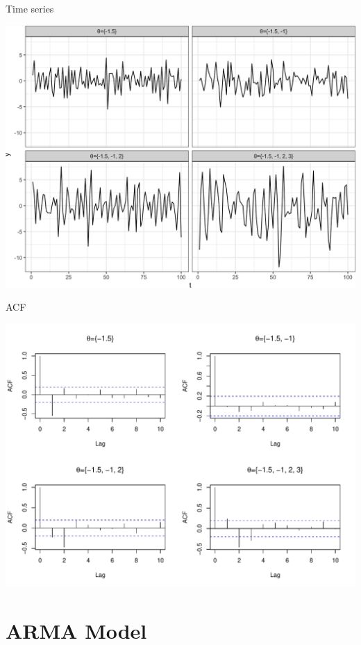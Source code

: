 \documentclass[11pt,ignorenonframetext,]{beamer}
\begin{document}
\begin{frame}{Time series}

\includegraphics{Lec8_files/figure-beamer/unnamed-chunk-3-1.png}

\end{frame}

\begin{frame}{ACF}

\includegraphics{Lec8_files/figure-beamer/unnamed-chunk-4-1.pdf}

\end{frame}

\section{ARMA Model}\label{arma-model}
\end{document}
